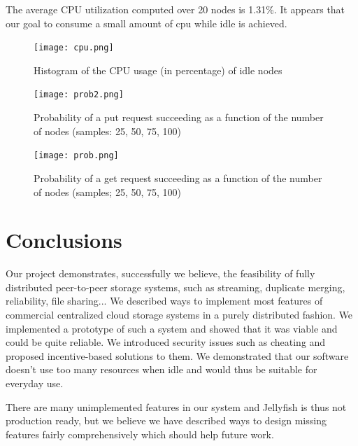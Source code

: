 \documentclass[11pt]{IEEEtran}
\begin{document}
The average CPU utilization computed over 20 nodes is 1.31\%. It appears that our goal to consume a small amount of cpu while idle is achieved.

\begin{figure}
\centering
\texttt{[image: cpu.png]}
\caption{Histogram of the CPU usage (in percentage) of idle nodes}
\end{figure}

\begin{figure}
\centering
\texttt{[image: prob2.png]}
\caption{Probability of a put request succeeding as a function of the number of nodes (samples: 25, 50, 75, 100)}
\end{figure}

\begin{figure}
\centering
\texttt{[image: prob.png]}
\caption{Probability of a get request succeeding as a function of the number of nodes (samples; 25, 50, 75, 100)}
\end{figure}

\section{Conclusions}

Our project demonstrates, successfully we believe, the feasibility of fully distributed peer-to-peer storage systems, such as streaming, duplicate merging, reliability, file sharing... We described ways to implement most features of commercial centralized cloud storage systems in a purely distributed fashion. We implemented a prototype of such a system and showed that it was viable and could be quite reliable. We introduced security issues such as cheating and proposed incentive-based solutions to them. We demonstrated that our software doesn't use too many resources when idle and would thus be suitable for everyday use.

There are many unimplemented features in our system and Jellyfish is thus not production ready, but we believe we have described ways to design  missing features fairly comprehensively which should help future work.
\end{document}

